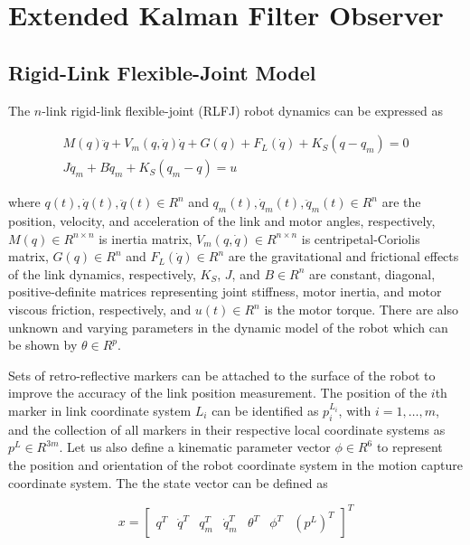 \documentclass[conference]{IEEEtran}
\begin{document}
\section{Extended Kalman Filter Observer}

\subsection{Rigid-Link Flexible-Joint Model}
The $n$-link rigid-link flexible-joint (RLFJ) robot dynamics can be expressed as

\begin{equation}
\begin{array}{ccccc}
M(q)\ddot q + {V_m}(q,\dot q)\dot q + G(q) + {F_L}(\dot q) + {K_S}(q - {q_m}) = 0\\
J{{\ddot q}_m} + B{{\dot q}_m} + {K_S}({q_m} - q) = u
\end{array}
\label{1}
\end{equation}

where $q(t),\dot q(t),\ddot q(t) \in {R^n}$ and ${q_m}(t),{{\dot
q}_m}(t),{{\ddot q}_m}(t) \in {R^n}$ are the position, velocity, and
acceleration of the link and motor angles, respectively, $M(q) \in {R^{n \times
n}}$ is inertia matrix, ${V_m}(q,\dot q) \in {R^{n \times n}}$ is
centripetal-Coriolis matrix, $G(q) \in {R^n}$ and ${F_L}(\dot q) \in {R^n}$ are
the gravitational and frictional effects of the link dynamics, respectively,
${K_S}$, $J$, and $B \in {R^n}$ are constant, diagonal, positive-definite
matrices representing joint stiffness, motor inertia, and motor viscous
friction, respectively, and $u(t) \in {R^n}$ is the motor torque. There are also
unknown and varying parameters in the dynamic model of the robot which can be
shown by $\theta  \in {R^p}$.

Sets of retro-reflective markers can be attached to the surface of the robot to
improve the accuracy of the link position measurement. The position of the $i$th
marker in link coordinate system $L_i$ can be identified as $p_i^{{L_i}}$,
with $i = 1,\ldots,m$, and the collection of all markers in their respective
local coordinate systems as ${p^L} \in {R^{3m}}$. Let us also define a
kinematic parameter vector $\phi  \in {R^6}$ to represent the position and
orientation of the robot coordinate system in the motion capture coordinate
system. The the state vector can be defined as

\begin{equation}
x = {[\begin{array}{*{20}{c}}
{{q^T}}&{{{\dot q}^T}}&{q_m^T}&{\dot q_m^T}&{{\theta ^T}}&{{\phi ^T}}&{{{({p^L})}^T}}
\end{array}]^T}
\label{4}
\end{equation}
\end{document}
